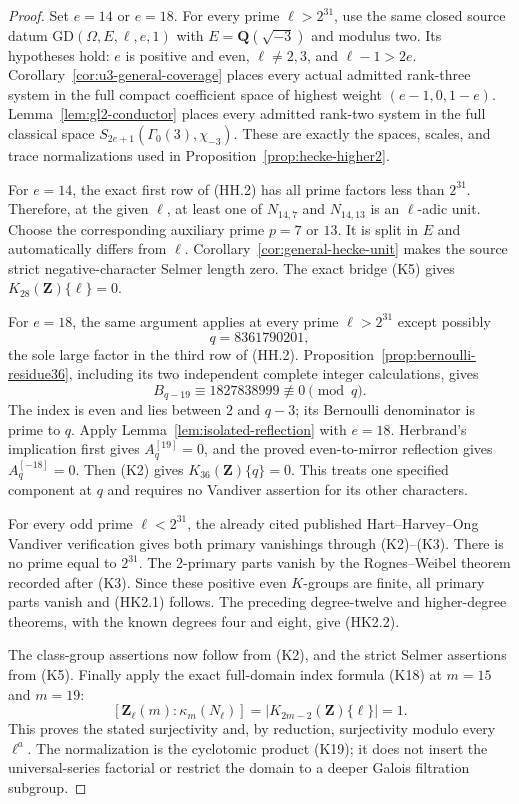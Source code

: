 \begin{proof}
Set $e=14$ or $e=18$.
For every prime $\ell>2^{31}$, use the same closed source datum
$\mathrm{GD}(\Omega,E,\ell,e,1)$ with
$E=\mathbf Q(\sqrt{-3})$ and modulus two.
Its hypotheses hold: $e$ is positive and even, $\ell\ne2,3$,
and $\ell-1>2e$.
Corollary~\ref{cor:u3-general-coverage} places every actual admitted
rank-three system in the full compact coefficient space of highest
weight $(e-1,0,1-e)$.
Lemma~\ref{lem:gl2-conductor} places every admitted rank-two system
in the full classical space $S_{2e+1}(\Gamma_0(3),\chi_{-3})$.
These are exactly the spaces, scales, and trace normalizations used in
Proposition~\ref{prop:hecke-higher2}.

For $e=14$, the exact first row of (HH.2) has all prime factors
less than $2^{31}$.
Therefore, at the given $\ell$, at least one of $N_{14,7}$ and
$N_{14,13}$ is an $\ell$-adic unit.
Choose the corresponding auxiliary prime $p=7$ or $13$.
It is split in $E$ and automatically differs from $\ell$.
Corollary~\ref{cor:general-hecke-unit} makes the source strict
negative-character Selmer length zero.
The exact bridge (K5) gives
$K_{28}(\mathbf Z)\{\ell\}=0$.

For $e=18$, the same argument applies at every prime
$\ell>2^{31}$ except possibly
\[
                              q=8361790201,
\]
the sole large factor in the third row of (HH.2).
Proposition~\ref{prop:bernoulli-residue36}, including its two independent
complete integer calculations, gives
\[
                B_{q-19}\equiv1827838999\not\equiv0\pmod q.
\]
The index is even and lies between $2$ and $q-3$;
its Bernoulli denominator is prime to $q$.
Apply Lemma~\ref{lem:isolated-reflection} with $e=18$.
Herbrand's implication first gives $A_q^{[19]}=0$,
and the proved even-to-mirror reflection gives $A_q^{[-18]}=0$.
Then (K2) gives $K_{36}(\mathbf Z)\{q\}=0$.
This treats one specified component at $q$ and requires no
Vandiver assertion for its other characters.

For every odd prime $\ell<2^{31}$, the already cited published
Hart--Harvey--Ong Vandiver verification gives both primary vanishings
through (K2)--(K3). There is no prime equal to $2^{31}$.
The 2-primary parts vanish by the Rognes--Weibel theorem recorded
after (K3). Since these positive even $K$-groups are finite,
all primary parts vanish and (HK2.1) follows.
The preceding degree-twelve and higher-degree theorems, with the known
degrees four and eight, give (HK2.2).

The class-group assertions now follow from (K2), and the strict Selmer
assertions from (K5).
Finally apply the exact full-domain index formula (K18) at
$m=15$ and $m=19$:
\[
 [\mathbf Z_\ell(m):\kappa_m(N_\ell)]
       =|K_{2m-2}(\mathbf Z)\{\ell\}|=1.
\]
This proves the stated surjectivity and, by reduction, surjectivity
modulo every $\ell^a$.
The normalization is the cyclotomic product (K19); it does not insert
the universal-series factorial or restrict the domain to a deeper
Galois filtration subgroup.
\end{proof}

